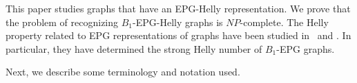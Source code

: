 \documentclass[9pt]{entcs}
\begin{document}







This paper studies graphs that have an EPG-Helly representation. We prove that the problem of recognizing $ B_1$-EPG-Helly graphs is $NP$-complete.   The Helly property related to EPG representations of graphs have been studied in~\cite{golumbic2009} and \cite{golumbic2013}. In particular, they have determined the strong Helly number of $B_1$-EPG graphs. 


 
 
 Next, we describe some terminology and notation used.

\end{document}
